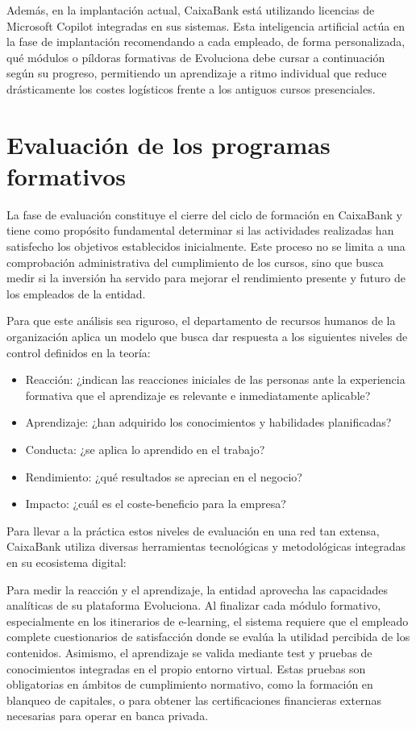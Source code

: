 Además, en la implantación actual, CaixaBank está utilizando licencias de Microsoft Copilot integradas en sus sistemas. Esta inteligencia artificial actúa en la fase de implantación recomendando a cada empleado, de forma personalizada, qué módulos o píldoras formativas de Evoluciona debe cursar a continuación según su progreso, permitiendo un aprendizaje a ritmo individual que reduce drásticamente los costes logísticos frente a los antiguos cursos presenciales.  

\section{Evaluación de los programas formativos}

La fase de evaluación constituye el cierre del ciclo de formación en CaixaBank y tiene como propósito fundamental determinar si las actividades realizadas han satisfecho los objetivos establecidos inicialmente. Este proceso no se limita a una comprobación administrativa del cumplimiento de los cursos, sino que busca medir si la inversión ha servido para mejorar el rendimiento presente y futuro de los empleados de la entidad.

Para que este análisis sea riguroso, el departamento de recursos humanos de la organización aplica un modelo que busca dar respuesta a los siguientes niveles de control definidos en la teoría:

\begin{itemize}
\item Reacción: ¿indican las reacciones iniciales de las personas ante la experiencia formativa que el aprendizaje es relevante e inmediatamente aplicable?
\item Aprendizaje: ¿han adquirido los conocimientos y habilidades planificadas?
\item Conducta: ¿se aplica lo aprendido en el trabajo?
\item Rendimiento: ¿qué resultados se aprecian en el negocio?
\item Impacto: ¿cuál es el coste-beneficio para la empresa?
\end{itemize}

Para llevar a la práctica estos niveles de evaluación en una red tan extensa, CaixaBank utiliza diversas herramientas tecnológicas y metodológicas integradas en su ecosistema digital:

Para medir la reacción y el aprendizaje, la entidad aprovecha las capacidades analíticas de su plataforma Evoluciona. Al finalizar cada módulo formativo, especialmente en los itinerarios de e-learning, el sistema requiere que el empleado complete cuestionarios de satisfacción donde se evalúa la utilidad percibida de los contenidos. Asimismo, el aprendizaje se valida mediante test y pruebas de conocimientos integradas en el propio entorno virtual. Estas pruebas son obligatorias en ámbitos de cumplimiento normativo, como la formación en blanqueo de capitales, o para obtener las certificaciones financieras externas necesarias para operar en banca privada.

